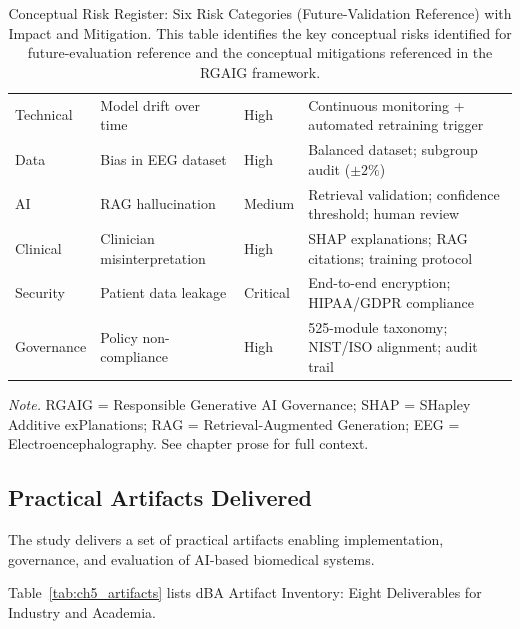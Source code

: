 {\tablestripes\tablefontsize
{}
\begin{xltabular}{\textwidth}{@{} >{\raggedright\arraybackslash}p{1.8cm} >{\raggedright\arraybackslash}p{2.5cm} >{\centering\arraybackslash}p{1.5cm} L @{}}
\caption[Conceptual Risk Register: Six Risk Categories (Future-Validation Reference) with]{Conceptual Risk Register: Six Risk Categories (Future-Validation Reference) with Impact and Mitigation. This table identifies the key conceptual risks identified for future-evaluation reference and the conceptual mitigations referenced in the RGAIG framework.}\label{tab:ch5_risk_register} \\
\toprule
{} &  &  &  \\
\midrule
\endfirsthead
\endhead
\bottomrule
\endlastfoot
Technical & Model drift over time & High & Continuous monitoring + automated retraining trigger \\
\addlinespace
Data & Bias in EEG dataset & High & Balanced dataset; subgroup audit ($\pm 2\%$) \\
\addlinespace
AI & RAG hallucination & Medium & Retrieval validation; confidence threshold; human review \\
\addlinespace
Clinical & Clinician misinterpretation & High & SHAP explanations; RAG citations; training protocol \\
\addlinespace
Security & Patient data leakage & Critical & End-to-end encryption; HIPAA/GDPR compliance \\
\addlinespace
Governance & Policy non-compliance & High & 525-module taxonomy; NIST/ISO alignment; audit trail \\
\end{xltabular}}
\vspace{0.3em}\noindent\textit{Note.} RGAIG = Responsible Generative AI Governance; SHAP = SHapley Additive exPlanations; RAG = Retrieval-Augmented Generation; EEG = Electroencephalography. See chapter prose for full context.

\subsection{Practical Artifacts Delivered}

The study delivers a set of practical artifacts enabling implementation, governance, and evaluation of AI-based biomedical systems.

\noindent Table~\ref{tab:ch5_artifacts} lists dBA Artifact Inventory: Eight Deliverables for Industry and Academia.

